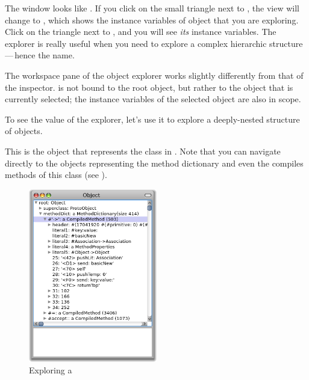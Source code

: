 \documentclass[a4paper,10pt,twoside]{book}
\begin{document}
The  window looks like .
If you click on the small triangle next to , the view will change to , which shows the instance variables of object that you are exploring.
Click on the triangle next to , and you will see \emph{its} instance variables.  
The explorer is really useful when you need to explore a complex hierarchic structure\,---\,hence the name.

The workspace pane of the object explorer works slightly differently from that of the inspector.
 is not bound to the root object, but rather to the object that is currently selected; the instance variables of the selected object are also in scope.

To see the value of the explorer, let's use it to explore a deeply-nested structure of objects.

This is the object that represents the class  in \pharo.
Note that you can navigate directly to the objects representing the method dictionary and even the compiles methods of this class (see ).

\begin{figure}[tbp]
	\begin{center}
		\includegraphics[width=0.5\textwidth]{ExploreObject}
	\end{center}
	\caption{Exploring a }
\end{figure}
\end{document}
